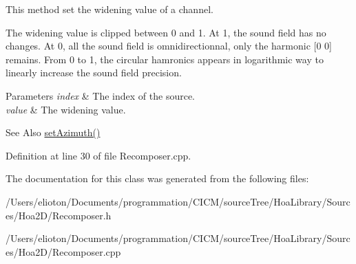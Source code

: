 This method set the widening value of a channel. 

The widening value is clipped between 0 and 1. At 1, the sound field has no changes. At 0, all the sound field is omnidirectionnal, only the harmonic \mbox{[}0 0\mbox{]} remains. From 0 to 1, the circular hamronics appears in logarithmic way to linearly increase the sound field precision.


\begin{DoxyParams}{Parameters}
{\em index} & The index of the source. \\
\hline
{\em value} & The widening value. \\
\hline
\end{DoxyParams}
\begin{DoxySeeAlso}{See Also}
\hyperlink{class_hoa2_d_1_1_recomposer_a2c1827fa0b25648b787077469e52a820}{set\-Azimuth()} 
\end{DoxySeeAlso}


Definition at line 30 of file Recomposer.\-cpp.



The documentation for this class was generated from the following files\-:\begin{DoxyCompactItemize}
\item 
/\-Users/elioton/\-Documents/programmation/\-C\-I\-C\-M/source\-Tree/\-Hoa\-Library/\-Sources/\-Hoa2\-D/Recomposer.\-h\item 
/\-Users/elioton/\-Documents/programmation/\-C\-I\-C\-M/source\-Tree/\-Hoa\-Library/\-Sources/\-Hoa2\-D/Recomposer.\-cpp\end{DoxyCompactItemize}
